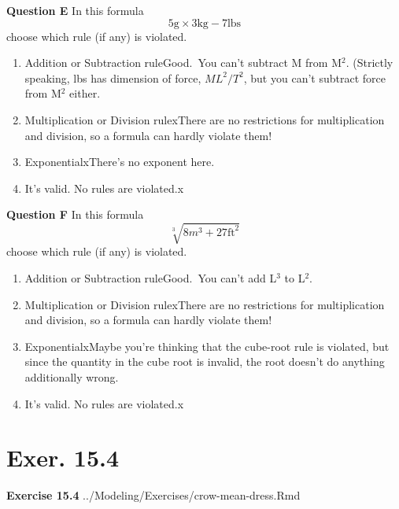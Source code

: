 \documentclass[
  letterpaper,
  DIV=11,
  numbers=noendperiod,
  oneside]{article}
\providecommand{\tightlist}{%
  \setlength{\itemsep}{0pt}\setlength{\parskip}{0pt}}\usepackage{longtable,booktabs,array}
\begin{document}
\begin{multicols}{2}
\textbf{Question E} In this formula
\[5 \text{g} \times 3 \text{kg} - 7 \text{lbs}\] choose which rule (if
any) is violated.

\begin{enumerate}
\def\labelenumi{\roman{enumi}.}
\tightlist
\item
  {Addition or Subtraction rule{Good.~You can't subtract M from M\(^2\).
  (Strictly speaking, lbs has dimension of force, \(M L^2 / T^2\), but
  you can't subtract force from M\(^2\) either.}}\\
\item
  {Multiplication or Division rule{xThere are no restrictions for
  multiplication and division, so a formula can hardly violate them!}}\\
\item
  {Exponential{xThere's no exponent here.}}\\
\item
  {It's valid. No rules are violated.{x}}
\end{enumerate}

\textbf{Question F} In this formula \[\sqrt[3]{8 m^3 + 27 \text{ft}^2}\]
choose which rule (if any) is violated.

\begin{enumerate}
\def\labelenumi{\roman{enumi}.}
\tightlist
\item
  {Addition or Subtraction rule{Good.~You can't add L\(^3\) to
  L\(^2\).}}\\
\item
  {Multiplication or Division rule{xThere are no restrictions for
  multiplication and division, so a formula can hardly violate them!}}\\
\item
  {Exponential{xMaybe you're thinking that the cube-root rule is
  violated, but since the quantity in the cube root is invalid, the root
  doesn't do anything additionally wrong.}}\\
\item
  {It's valid. No rules are violated.{x}}
\end{enumerate}

\hypertarget{exer.-15.4}{%
\section*{Exer. 15.4}\label{exer.-15.4}}

\textbf{Exercise 15.4} ../Modeling/Exercises/crow-mean-dress.Rmd


\end{multicols}
\end{document}
